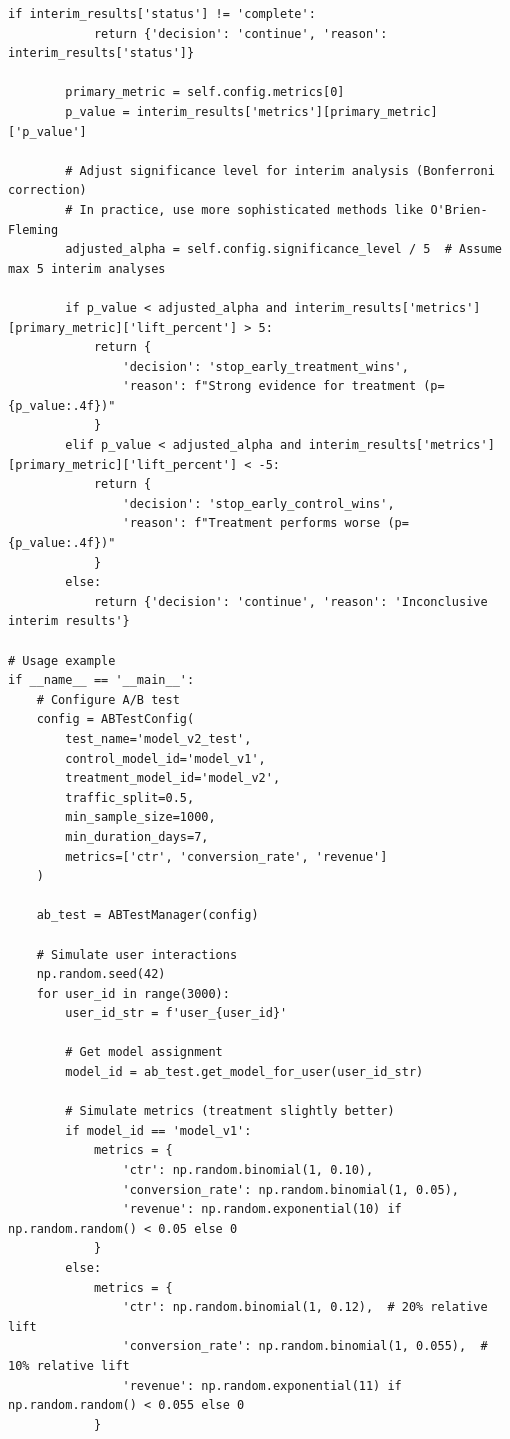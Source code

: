 \begin{lstlisting}[style=python, caption=Production A/B testing framework for ML models]
        if interim_results['status'] != 'complete':
            return {'decision': 'continue', 'reason': interim_results['status']}

        primary_metric = self.config.metrics[0]
        p_value = interim_results['metrics'][primary_metric]['p_value']

        # Adjust significance level for interim analysis (Bonferroni correction)
        # In practice, use more sophisticated methods like O'Brien-Fleming
        adjusted_alpha = self.config.significance_level / 5  # Assume max 5 interim analyses

        if p_value < adjusted_alpha and interim_results['metrics'][primary_metric]['lift_percent'] > 5:
            return {
                'decision': 'stop_early_treatment_wins',
                'reason': f"Strong evidence for treatment (p={p_value:.4f})"
            }
        elif p_value < adjusted_alpha and interim_results['metrics'][primary_metric]['lift_percent'] < -5:
            return {
                'decision': 'stop_early_control_wins',
                'reason': f"Treatment performs worse (p={p_value:.4f})"
            }
        else:
            return {'decision': 'continue', 'reason': 'Inconclusive interim results'}

# Usage example
if __name__ == '__main__':
    # Configure A/B test
    config = ABTestConfig(
        test_name='model_v2_test',
        control_model_id='model_v1',
        treatment_model_id='model_v2',
        traffic_split=0.5,
        min_sample_size=1000,
        min_duration_days=7,
        metrics=['ctr', 'conversion_rate', 'revenue']
    )

    ab_test = ABTestManager(config)

    # Simulate user interactions
    np.random.seed(42)
    for user_id in range(3000):
        user_id_str = f'user_{user_id}'

        # Get model assignment
        model_id = ab_test.get_model_for_user(user_id_str)

        # Simulate metrics (treatment slightly better)
        if model_id == 'model_v1':
            metrics = {
                'ctr': np.random.binomial(1, 0.10),
                'conversion_rate': np.random.binomial(1, 0.05),
                'revenue': np.random.exponential(10) if np.random.random() < 0.05 else 0
            }
        else:
            metrics = {
                'ctr': np.random.binomial(1, 0.12),  # 20% relative lift
                'conversion_rate': np.random.binomial(1, 0.055),  # 10% relative lift
                'revenue': np.random.exponential(11) if np.random.random() < 0.055 else 0
            }


\end{lstlisting}

